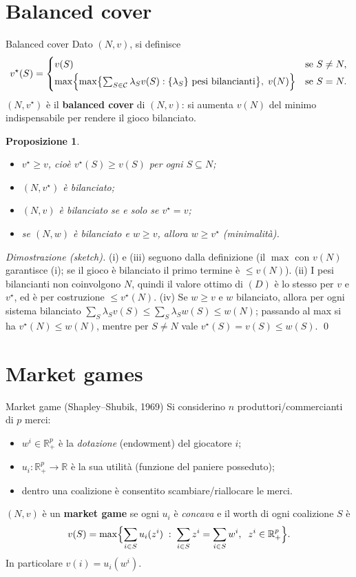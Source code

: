 \documentclass[12pt,a4paper,twoside]{book}
\theoremstyle{plain}
\newtheorem{proposition}[theorem]{Proposizione}
\theoremstyle{definition}
\begin{document}
\section{Balanced cover}

\begin{defbox}{Balanced cover}
Dato $(N,v)$, si definisce
\[
  v^{\star}(S)=\begin{cases}
    v(S) & \text{se } S\ne N,\\[2pt]
    \max\Bigl\{\max\bigl\{\sum_{S\in\mathcal{C}}\lambda_S v(S):\{\lambda_S\}\ \text{pesi bilancianti}\bigr\},\;v(N)\Bigr\} & \text{se } S=N.
  \end{cases}
\]
$(N,v^{\star})$ è il \textbf{balanced cover} di $(N,v)$: si aumenta $v(N)$ del
minimo indispensabile per rendere il gioco bilanciato.
\end{defbox}

\begin{proposition}
\begin{itemize}
  \item[(i)] $v^{\star}\ge v$, cioè $v^{\star}(S)\ge v(S)$ per ogni $S\subseteq N$;
  \item[(ii)] $(N,v^{\star})$ è bilanciato;
  \item[(iii)] $(N,v)$ è bilanciato se e solo se $v^{\star}=v$;
  \item[(iv)] se $(N,w)$ è bilanciato e $w\ge v$, allora $w\ge v^{\star}$ (minimalità).
\end{itemize}
\end{proposition}

\textit{Dimostrazione (sketch).} (i) e (iii) seguono dalla definizione (il $\max$
con $v(N)$ garantisce (i); se il gioco è bilanciato il primo termine è
$\le v(N)$). (ii) I pesi bilancianti non coinvolgono $N$, quindi il valore ottimo
di $(D)$ è lo stesso per $v$ e $v^{\star}$, ed è per costruzione
$\le v^{\star}(N)$. (iv) Se $w\ge v$ e $w$ bilanciato, allora per ogni sistema
bilanciato $\sum_S\lambda_S v(S)\le\sum_S\lambda_S w(S)\le w(N)$; passando al max
si ha $v^{\star}(N)\le w(N)$, mentre per $S\ne N$ vale $v^{\star}(S)=v(S)\le w(S)$. \qed

\section{Market games}

\begin{defbox}{Market game (Shapley--Shubik, 1969)}
Si considerino $n$ produttori/commercianti di $p$ merci:
\begin{itemize}
  \item $w^i\in\mathbb{R}^p_+$ è la \emph{dotazione} (endowment) del giocatore $i$;
  \item $u_i:\mathbb{R}^p_+\to\mathbb{R}$ è la sua utilità (funzione del paniere posseduto);
  \item dentro una coalizione è consentito scambiare/riallocare le merci.
\end{itemize}
$(N,v)$ è un \textbf{market game} se ogni $u_i$ è \emph{concava} e il worth di
ogni coalizione $S$ è
\[
  v(S)=\max\Bigl\{\sum_{i\in S}u_i(z^i)\;:\;\sum_{i\in S}z^i=\sum_{i\in S}w^i,\;\;z^i\in\mathbb{R}^p_+\Bigr\}.
\]
In particolare $v(i)=u_i(w^i)$.
\end{defbox}
\end{document}
